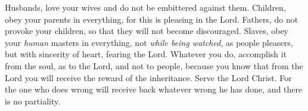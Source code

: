 \begin{biblechapter}
\verse Husbands, love your wives and do not be embittered against them.
\verse Children, obey your parents in everything, for this is pleasing in the Lord.
\verse Fathers, do not provoke your children, so that they will not become discouraged.
\verse Slaves, obey your \textit{human} masters in everything, not \textit{while being watched}, as people pleasers, but with sincerity of heart, fearing the Lord.
\verse Whatever you do, accomplish it from the soul, as to the Lord, and not to people,
\verse because you know that from the Lord you will receive the reward of the inheritance. Serve the Lord Christ.
\verse For the one who does wrong will receive back whatever wrong he has done, and there is no partiality.
\end{biblechapter}


